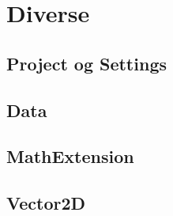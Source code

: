 \section{Diverse}\label{Diverse}
\subsection{Project og Settings}
\subsection{Data}
\subsection{MathExtension}
\subsection{Vector2D}